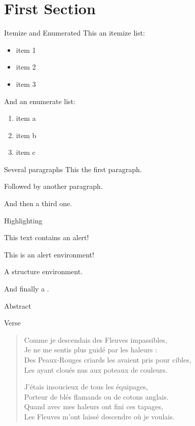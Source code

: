 \documentclass[handout, 10pt]{beamer}
\begin{document}
\section{First Section}


\begin{frame}{Itemize and Enumerated}
	This an itemize list:
	\begin{itemize}
		\item item 1
		\item item 2
		\item item 3
	\end{itemize}

	And an enumerate list:
	\begin{enumerate}
		\item item a
		\item item b
		\item item c
	\end{enumerate}
\end{frame}


\begin{frame}{Several paragraphs}
	This the first paragraph.

	Followed by another paragraph.

	And then a third one.
\end{frame}


\begin{frame}{Highlighting}

	This text contains an \alert{alert}!

	\begin{alertenv}
		This is an alert environment!
	\end{alertenv}

	\begin{structureenv}
		A structure environment.
	\end{structureenv}

	And finally a .

\end{frame}

\begin{frame}{Abstract}
	\begin{abstract}
		\lipsum[10-10]
	\end{abstract}
\end{frame}


\begin{frame}{Verse}
	\begin{verse}
		Comme je descendais des Fleuves impassibles, \\
		Je ne me sentis plus guidé par les haleurs : \\
		Des Peaux-Rouges criards les avaient pris pour cibles, \\
		Les ayant cloués nus aux poteaux de couleurs.

		J’étais insoucieux de tous les équipages, \\
		Porteur de blés flamands ou de cotons anglais. \\
		Quand avec mes haleurs ont fini ces tapages, \\
		Les Fleuves m’ont laissé descendre où je voulais.
	\end{verse}
\end{frame}
\end{document}
